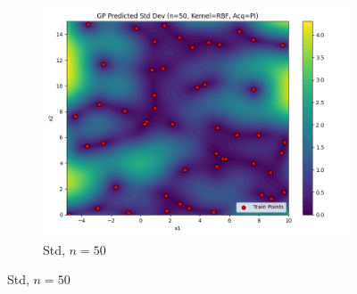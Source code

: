 \documentclass[a4paper,12pt]{article}
\begin{document}
\begin{figure}[H]
\begin{subfigure}{0.3\textwidth}
    \includegraphics[width=\linewidth]{Task-02/images/gp_std_rbf_n50_PI.png}
    \caption{Std, $n=50$}
\end{subfigure}


\end{figure}
\end{document}
